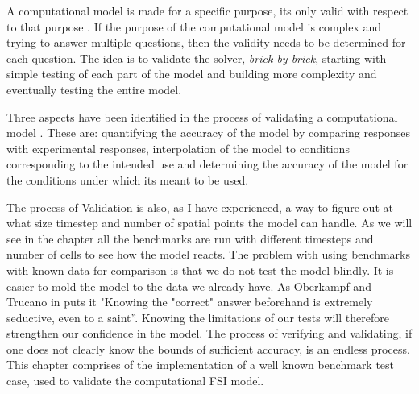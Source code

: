 A computational model is made for a specific purpose, its only valid with respect to that purpose \cite{Macal2005}. If the purpose of the computational model is complex and trying to answer multiple questions, then the validity needs to be determined for each question. The idea is to validate the solver, \textsl{brick by brick}, starting with simple testing of each part of the model and building more complexity and eventually testing the entire model.\newline

Three aspects have been identified in the process of validating a computational model \cite{Selin2014}. These are: quantifying the accuracy of the model by comparing responses with experimental responses, interpolation of the model to conditions corresponding to the intended use and determining the accuracy of the model for the conditions under which its meant to be used. \newline

The process of Validation is also, as I have experienced, a way to figure out at what size timestep and number of spatial points the model can handle. As we will see in the chapter all the benchmarks are run with different timesteps and number of cells to see how the model reacts. The problem with using benchmarks with known data for comparison is that we do not test the model blindly. It is easier to mold the model to the data we already have. As Oberkampf and Trucano in \cite{Selin2014} puts it "Knowing the "correct" answer beforehand is extremely seductive, even to a saint''. Knowing the limitations of our tests will therefore strengthen our confidence in the model. The process of verifying and validating, if one does not clearly know the bounds of sufficient accuracy, is an endless process. \cite{Selin2014} \\

This chapter comprises of the implementation of a well known benchmark test case, used to validate the computational FSI model.


%











